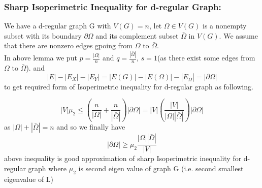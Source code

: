 \documentclass[oneside]{book}
\begin{document}
		\subsubsection{Sharp Isoperimetric Inequality for d-regular Graph:}
		 
		 We have a d-regular graph G with $V(G) = n $, let $\Omega \in V(G) $ is a nonempty subset  with its boundary $\partial \Omega$ and its complement subset  $\bar{\Omega}$ in $V(G)$. We assume that there are nonzero edges gpoing from    $\Omega$ to $\bar{\Omega}$. 
		 \\
		 In above lemma we put $p =  \frac{|\Omega|}{n}$ and  $q =  \frac{|\bar{\Omega} |}{n}$,  $s= 1$(as there exist some edges from   $\Omega$ to $\bar{\Omega}$).
		  and     
		 $$|E|-\left|E_{X}\right|-\left|E_{Y}\right| = |E(G)|-\left|E(\Omega)\right|-\left|E_{\bar{\Omega}}\right| = |\partial \Omega|$$
		to get required form of Isoperimetric inequality for d-regular graph as following.
		 
		 	 $$ |V|\mu_{2}   \leqslant  \left(\frac{n}{|\Omega|}+\frac{n}{|\bar{\Omega}|}\right)  |\partial \Omega| =|V| \left( \frac{  |V| }{|\Omega||\bar{\Omega}| } \right)|\partial \Omega|    $$
		 as  $|\Omega|+|\bar{\Omega}| = n$ and so we finally have
		 $$
		|\partial \Omega| \geq \mu_{2} \frac{|\Omega||\bar{\Omega}|}{|V|}$$
		above inequality is good approximation of sharp Isoperimetric inequality for d-regular graph  
		where $\mu_{2} $ is second eigen value of graph G (i.e. second smallest eigenvalue of L)
		
		
	 
\end{document}
